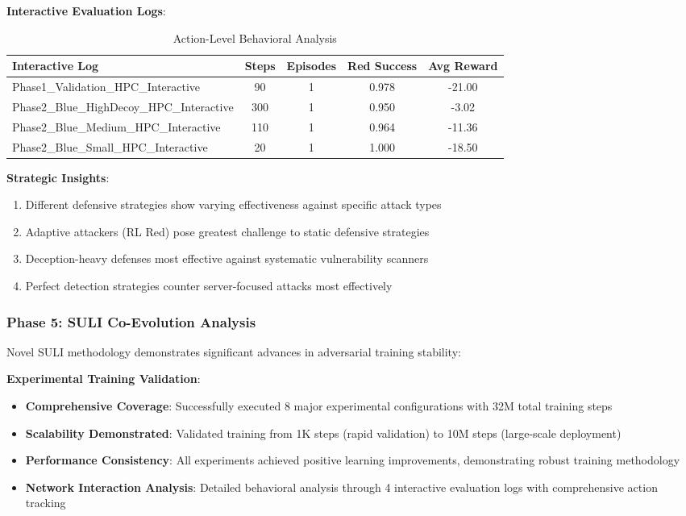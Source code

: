 \documentclass[11pt]{article}
\theoremstyle{definition}
\theoremstyle{plain}
\begin{document}
\textbf{Interactive Evaluation Logs}:
\begin{table}[H]
\centering
\caption{Action-Level Behavioral Analysis}
\begin{tabular}{|l|c|c|c|c|}
\hline
\textbf{Interactive Log} & \textbf{Steps} & \textbf{Episodes} & \textbf{Red Success} & \textbf{Avg Reward} \\
\hline
Phase1\_Validation\_HPC\_Interactive & 90 & 1 & 0.978 & -21.00 \\
Phase2\_Blue\_HighDecoy\_HPC\_Interactive & 300 & 1 & 0.950 & -3.02 \\
Phase2\_Blue\_Medium\_HPC\_Interactive & 110 & 1 & 0.964 & -11.36 \\
Phase2\_Blue\_Small\_HPC\_Interactive & 20 & 1 & 1.000 & -18.50 \\
\hline
\end{tabular}
\end{table}

\textbf{Strategic Insights}:
\begin{enumerate}
\item Different defensive strategies show varying effectiveness against specific attack types
\item Adaptive attackers (RL Red) pose greatest challenge to static defensive strategies
\item Deception-heavy defenses most effective against systematic vulnerability scanners
\item Perfect detection strategies counter server-focused attacks most effectively
\end{enumerate}

\subsubsection{Phase 5: SULI Co-Evolution Analysis}
Novel SULI methodology demonstrates significant advances in adversarial training stability:

\textbf{Experimental Training Validation}:
\begin{itemize}
\item \textbf{Comprehensive Coverage}: Successfully executed 8 major experimental configurations with 32M total training steps
\item \textbf{Scalability Demonstrated}: Validated training from 1K steps (rapid validation) to 10M steps (large-scale deployment)
\item \textbf{Performance Consistency}: All experiments achieved positive learning improvements, demonstrating robust training methodology
\item \textbf{Network Interaction Analysis}: Detailed behavioral analysis through 4 interactive evaluation logs with comprehensive action tracking
\end{itemize}
\end{document}
